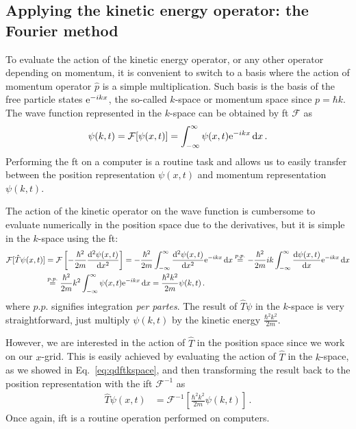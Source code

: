 \subsection{Applying the kinetic energy operator: the Fourier method}


To evaluate the action of the kinetic energy operator, or any other operator depending on momentum, it is convenient to switch to a basis where the action of momentum operator $\hat{p}$ is a simple multiplication. Such basis is the basis of the free particle states $\mathrm{e}^{-ikx}$, the so-called $k$-space or momentum space since $p = \hbar k$. The wave function represented in the $k$-space can be obtained by \acrfull{ft} $\mathcal{F}$ as
\begin{align}
    \psi(k,t) = \mathcal{F}[\psi(x,t)] =\int_{-\infty}^\infty \psi(x,t) \mathrm{e}^{-ikx}\mathop{}\!\mathrm{d} x \, .
\end{align}
Performing the \acrshort{ft} on a computer is a routine task and allows us to easily transfer between the position representation $\psi(x,t)$ and momentum representation $\psi(k,t)$.

The action of the kinetic operator on the wave function is cumbersome to evaluate numerically in the position space due to the derivatives, but it is simple in the $k$-space using the \acrshort{ft}:
\begin{align}
    \mathcal{F}[\hat{T}\psi(x,t)] &= \mathcal{F}\left[-\frac{\hbar^2}{2m}\frac{\dd^2 \psi(x,t)}{\dd x^2}\right] = -\frac{\hbar^2}{2m} \int_{-\infty}^\infty \frac{\dd^2 \psi(x,t)}{\dd x^2}  \e^{-ikx}\dd x \stackrel{p.p.}{=} -\frac{\hbar^2}{2m} i k \int_{-\infty}^\infty \frac{\dd \psi(x,t)}{\dd x} \e^{-ikx}\dd x \notag \\
    &\stackrel{p.p.}{=} \frac{\hbar^2}{2m} k^2 \int_{-\infty}^\infty \psi(x,t) \e^{-ikx}\dd x = \frac{\hbar^2 k^2}{2m} \psi(k,t) \, .
    \label{eq:qdftkspace}
\end{align}
where $p.p.$ signifies integration \textit{per partes}. The result of $\hat{T}\psi$ in the $k$-space is very straightforward, just multiply $\psi(k,t)$ by the kinetic energy $\frac{\hbar^2 k^2}{2m}$.

However, we are interested in the action of $\hat{T}$ in the position space since we work on our $x$-grid. This is easily achieved by evaluating the action of $\hat{T}$ in the $k$-space, as we showed in Eq.~\eqref{eq:qdftkspace}, and then transforming the result back to the position representation with the \acrfull{ift} $\mathcal{F}^{-1}$ as
\begin{align}
    \hat{T}\psi(x,t) &= \mathcal{F}^{-1}\left[\frac{\hbar^2 k^2}{2m} \psi(k,t)\right] \, .
\end{align}
Once again, \acrshort{ift} is a routine operation performed on computers.

